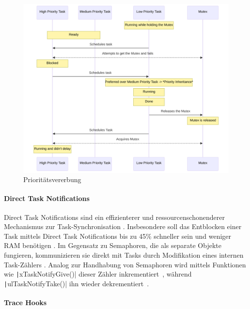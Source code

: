 \begin{figure}[H]
    \centering
    \includegraphics[width=1\textwidth]{assets/prio_inheritance}
    \caption{Prioritätsvererbung}
\end{figure}

\paragraph{Direct Task Notifications} \label{sec:direct_task_notification}

Direct Task Notifications sind ein effizienterer und ressourcenschonenderer
Mechanismus zur Task-Synchronisation \cite{freertos_task_notifications_desc}.
Insbesondere soll das Entblocken einer Task mittels Direct Task Notifications
bis zu 45\% schneller sein und weniger RAM benötigen
\cite{freertos_task_notifications_usage}. Im Gegensatz zu Semaphoren, die als
separate Objekte fungieren, kommunizieren sie direkt mit Tasks durch
Modifikation eines internen Task-Zählers \cite{freertos_tasks_c_308}. Analog zur
Handhabung von Semaphoren wird mittels Funktionen wie
\texttt|xTaskNotifyGive()| dieser Zähler
inkrementiert~\cite{freertos_tasks_c_4990}, während
\texttt|ulTaskNotifyTake()| ihn wieder
dekrementiert~\cite{freertos_tasks_c_4614}. 

\paragraph{Trace Hooks} \label{sec:trace_hooks}


